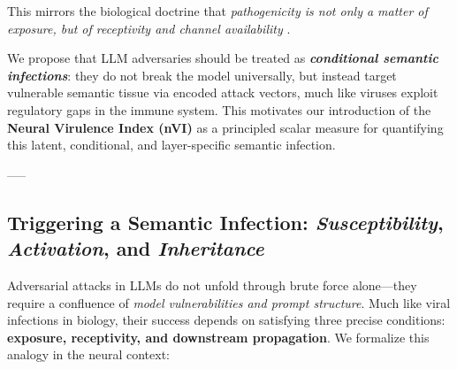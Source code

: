 This mirrors the biological doctrine that \emph{pathogenicity is not only a matter of exposure, but of receptivity and channel availability} \cite{casadevall2001host, schmid2007infectious}.

\vspace{0.75em}
We propose that LLM adversaries should be treated as \textbf{\textit{conditional semantic infections}}: they do not break the model universally, but instead target vulnerable semantic tissue via encoded attack vectors, much like viruses exploit regulatory gaps in the immune system. This motivates our introduction of the \textbf{Neural Virulence Index (nVI)} as a principled scalar measure for quantifying this latent, conditional, and layer-specific semantic infection.

-----



\subsection{Triggering a Semantic Infection: \emph{Susceptibility}, \emph{Activation}, and \emph{Inheritance}}

Adversarial attacks in LLMs do not unfold through brute force alone—they require a confluence of \emph{model vulnerabilities and prompt structure}. Much like viral infections in biology, their success depends on satisfying three precise conditions: \textbf{exposure, receptivity, and downstream propagation}. We formalize this analogy in the neural context:



